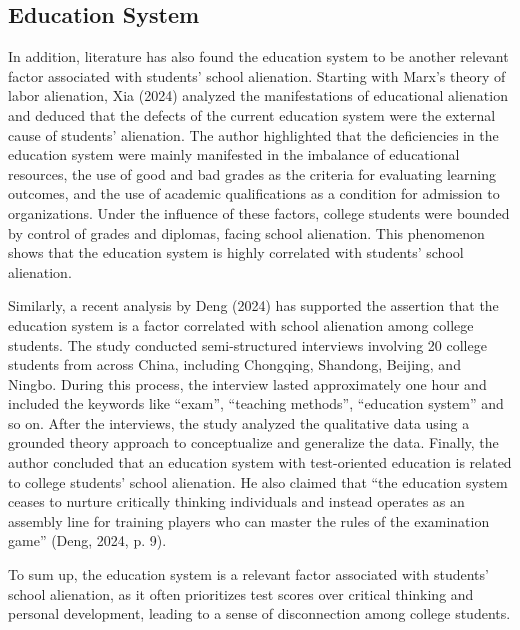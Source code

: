 \documentclass{scupi_apa_thesis}
\begin{document}
\subsection{Education System}
\par
In addition, literature has also found the education system to be another relevant factor 
associated with students’ school alienation. Starting with Marx's theory of labor alienation, Xia 
(2024) analyzed the manifestations of educational alienation and deduced that the defects of the 
current education system were the external cause of students’ alienation. The author highlighted 
that the deficiencies in the education system were mainly manifested in the imbalance of 
educational resources, the use of good and bad grades as the criteria for evaluating learning 
outcomes, and the use of academic qualifications as a condition for admission to organizations. 
Under the influence of these factors, college students were bounded by control of grades and 
diplomas, facing school alienation. This phenomenon shows that the education system is highly 
correlated with students’ school alienation.
\par
Similarly, a recent analysis by Deng (2024) has supported the assertion that the education 
system is a factor correlated with school alienation among college students. The study conducted 
semi-structured interviews involving 20 college students from across China, including Chongqing, 
Shandong, Beijing, and Ningbo. During this process, the interview lasted approximately one hour 
and included the keywords like “exam”, “teaching methods”, “education system” and so on. After 
the interviews, the study analyzed the qualitative data using a grounded theory approach to 
conceptualize and generalize the data. Finally, the author concluded that an education system with 
test-oriented education is related to college students’ school alienation. He also claimed that “the 
education system ceases to nurture critically thinking individuals and instead operates as an 
assembly line for training players who can master the rules of the examination game” (Deng, 2024, 
p. 9).
\par
To sum up, the education system is a relevant factor associated with students’ school 
alienation, as it often prioritizes test scores over critical thinking and personal development, 
leading to a sense of disconnection among college students.
\end{document}

